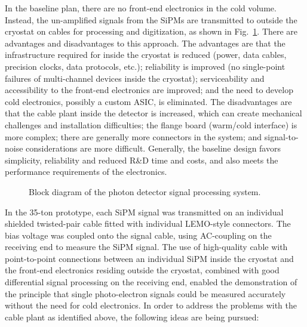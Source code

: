 In the baseline plan, there are no front-end electronics in the cold
volume.  Instead, the un-amplified signals from the SiPMs are
transmitted to outside the cryostat on cables for processing and
digitization, as shown in Fig.~\ref{fig:fig-e-1}.  There are
advantages and disadvantages to this approach.  The advantages are
that the infrastructure required for inside the cryostat is reduced
(power, data cables, precision clocks, data protocols, etc.);
reliability is improved (no single-point failures of multi-channel
devices inside the cryostat); serviceability and accessibility to the
front-end electronics are improved; and the need to develop cold
electronics, possibly a custom ASIC, is eliminated.  The disadvantages
are that the cable plant inside the detector is increased, which can
create mechanical challenges and installation difficulties; the flange
board (warm/cold interface) is more complex; there are generally more
connectors in the system; and signal-to-noise considerations are more
difficult.  Generally, the baseline design favors simplicity,
reliability and reduced R\&D time and costs, and also meets the
performance requirements of the electronics.
%
 \begin{figure}[h]
  \centering
\caption{Block diagram of the photon detector signal processing system.}
\label{fig:fig-e-1}
\end{figure}
%
In the 35-ton prototype, each SiPM signal was transmitted on an
individual shielded twisted-pair cable fitted with individual
LEMO-style connectors.  The bias voltage was coupled onto the signal
cable, using AC-coupling on the receiving end to measure the SiPM
signal.  The use of high-quality cable with point-to-point connections
between an individual SiPM inside the cryostat and the front-end
electronics residing outside the cryostat, combined with good
differential signal processing on the receiving end, enabled the
demonstration of the principle that single photo-electron signals
could be measured accurately without the need for cold electronics.
In order to address the problems with the cable plant as identified
above, the following ideas are being pursued:
